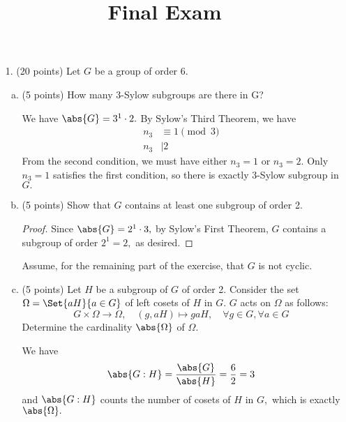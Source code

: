 \documentclass{article}
\begin{document}
\title{Final Exam}
\maketitle
\thispagestyle{fancy}

\newpage

\begin{itemize}
	\item[1.] (20 points) Let $G$ be a group of order 6.
		\begin{enumerate}[(a)]
			\item (5 points) How many 3-Sylow subgroups are there in G?
				\begin{soln}
					We have $\abs{G}=3^1\cdot 2.$ By Sylow's Third Theorem, we have
					\begin{align*}
						n_3 &\equiv 1\pmod 3 \\
						n_3 &\mid 2
					\end{align*}
					From the second condition, we must have either $n_3=1$ or $n_3=2.$ Only $n_3=1$ satisfies the first condition, so there is exactly  3-Sylow subgroup in $G.$	
				\end{soln}

			\item (5 points) Show that $G$ contains at least one subgroup of order 2.
				\begin{proof}
					Since $\abs{G}=2^1\cdot 3,$ by Sylow's First Theorem, $G$ contains a subgroup of order $2^1=2,$ as desired.
				\end{proof}

				Assume, for the remaining part of the exercise, that $G$ is not cyclic.

			\item (5 points) Let $H$ be a subgroup of $G$ of order 2. Consider the set $\Omega=\Set{aH}{a\in G}$ of left cosets of $H$ in $G.$ $G$ acts on $\Omega$ as follows:
				\[G\times \Omega\to \Omega, \quad (g, aH)\mapsto gaH, \quad \forall g\in G, \forall a\in G\]
				Determine the cardinality $\abs{\Omega}$ of $\Omega.$
				\begin{soln}
					We have 
					\[\abs{G:H}=\frac{\abs{G}}{\abs{H}}=\frac{6}{2}=3\]
					and $\abs{G:H}$ counts the number of cosets of $H$ in $G,$ which is exactly $\abs{\Omega}.$
				\end{soln}


\end{enumerate}
\end{itemize}
\end{document}

